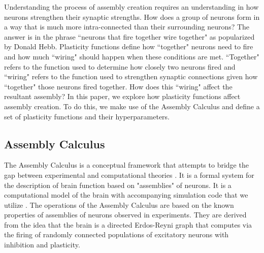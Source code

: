 \documentclass{article}
\begin{document}
Understanding the process of assembly creation requires an understanding in how neurons strengthen their synaptic strengths. How does a group of neurons form in a way that is much more intra-connected than their surrounding neurons? The answer is in the phrase ``neurons that fire together wire together" as popularized by Donald Hebb. Plasticity functions define how ``together" neurons need to fire and how much ``wiring" should happen when these conditions are met. ``Together" refers to the function used to determine how closely two neurons fired and ``wiring" refers to the function used to strengthen synaptic connections given how ``together" those neurons fired together. How does this ``wiring" affect the resultant assembly? In this paper, we explore how plasticity functions affect assembly creation. To do this, we make use of the Assembly Calculus and define a set of plasticity functions and their hyperparameters.

\subsection{Assembly Calculus}
The Assembly Calculus is a conceptual framework that attempts to bridge the gap between experimental and computational theories \cite{Papadimitriou14464}. It is a formal system for the description of brain function based on "assemblies" of neurons. It is a computational model of the brain with accompanying simulation code that we utilize \cite{assembly_calculus}. The operations of the Assembly Calculus are based on the known properties of assemblies of neurons observed in experiments. They are derived from the idea that the brain is a directed Erdos-Reyni graph \cite{Erdos:1960} that computes via the firing of randomly connected populations of excitatory neurons with inhibition and plasticity.

\end{document}
